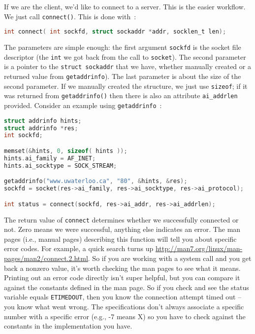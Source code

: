 If we are the client, we'd like to connect to a server. This is the easier workflow. We just call \texttt{connect()}. This is done with~\cite{apunix}:

\begin{lstlisting}[language=C]
int connect( int sockfd, struct sockaddr *addr, socklen_t len); 
\end{lstlisting}

The parameters are simple enough: the first argument \texttt{sockfd} is the socket file descriptor (the \texttt{int} we got back from the call to \texttt{socket}). The second parameter is a pointer to the \texttt{struct sockaddr} that we have, whether manually created or a returned value from \texttt{getaddrinfo}). The last parameter is about the size of the second parameter. If we manually created the structure, we just use \texttt{sizeof}; if it was returned from \texttt{getaddrinfo()} then there is also an attribute \texttt{ai\_addrlen} provided. Consider an example using \texttt{getaddrinfo}~\cite{getaddrinfo}:

\begin{lstlisting}[language=C]
struct addrinfo hints;
struct addrinfo *res;
int sockfd;

memset(&hints, 0, sizeof( hints ));
hints.ai_family = AF_INET;
hints.ai_socktype = SOCK_STREAM;

getaddrinfo("www.uwaterloo.ca", "80", &hints, &res);
sockfd = socket(res->ai_family, res->ai_socktype, res->ai_protocol);

int status = connect(sockfd, res->ai_addr, res->ai_addrlen);
\end{lstlisting}

The return value of \texttt{connect} determines whether we successfully connected or not. Zero means we were successful, anything else indicates an error. The man pages (i.e., manual pages) describing this function will tell you about specific error codes. For example, a quick search turns up \url{http://man7.org/linux/man-pages/man2/connect.2.html}. So if you are working with a system call and you get back a nonzero value, it's worth checking the man pages to see what it means. Printing out an error code directly isn't super helpful, but you can compare it against the constants defined in the man page. So if you check and see the status variable equals \texttt{ETIMEDOUT}, then you know the connection attempt timed out -- you know what went wrong. The specifications don't always associate a specific number with a specific error (e.g., -7 means X) so you have to check against the constants in the implementation you have.


